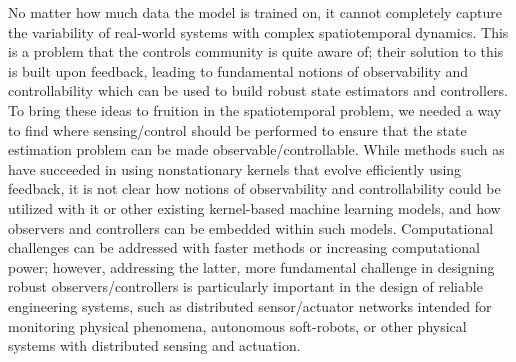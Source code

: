 No matter how much data the model is trained on, it cannot completely capture the variability of real-world systems with complex spatiotemporal dynamics. This is a problem that the controls community is quite aware of; their solution to this is built upon feedback, leading to fundamental notions of observability and controllability which can be used to build robust state estimators and controllers. To bring these ideas to fruition in the spatiotemporal problem, we needed a way to find where sensing/control should be performed to ensure that the state estimation problem can be made observable/controllable. %
While methods such as \cite{todescato2017efficient} have succeeded in using nonstationary kernels that evolve efficiently using feedback, it is not clear how notions of observability and controllability could be utilized with it or other existing kernel-based machine learning models, and how observers and controllers can be embedded within such models.
Computational challenges can be addressed with faster methods or increasing computational power; however, addressing the latter, more fundamental challenge in designing robust observers/controllers is particularly important in the design of reliable engineering systems, such as distributed sensor/actuator networks intended for monitoring physical phenomena, autonomous soft-robots, or other physical systems with distributed sensing and actuation.  %
% 
   

